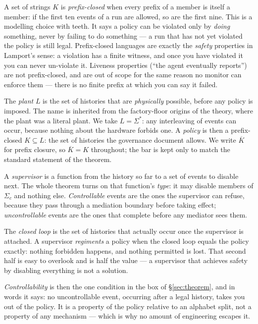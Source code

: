 \documentclass[11pt,a4paper]{article}  \usepackage{mdframed} \usepackage{graphicx}
\begin{document}
A set of strings $K$ is \emph{prefix-closed} when every prefix of a member is itself a member: if the first ten events of a
run are allowed, so are the first nine. This is a modelling choice with teeth. It says a policy can be violated only by
\emph{doing} something, never by failing to do something --- a run that has not yet violated the policy is still legal.
Prefix-closed languages are exactly the \emph{safety} properties in Lamport's sense: a violation has a finite witness, and
once you have violated it you can never un-violate it. Liveness properties (``the agent eventually reports'') are not
prefix-closed, and are out of scope for the same reason no monitor can enforce them --- there is no finite prefix at which
you can say it failed.

The \emph{plant} $L$ is the set of histories that are \emph{physically} possible, before any policy is imposed. The name is
inherited from the factory-floor origins of the theory, where the plant was a literal plant. We take $L=\Sigma^*$: any
interleaving of events can occur, because nothing about the hardware forbids one. A \emph{policy} is then a prefix-closed
$K\subseteq L$: the set of histories the governance document allows. We write $\overline{K}$ for prefix closure, so
$\overline{K}=K$ throughout; the bar is kept only to match the standard statement of the theorem.

A \emph{supervisor} is a function from the history so far to a set of events to disable next. The whole theorem turns on
that function's \emph{type}: it may disable members of $\Sigma_c$ and nothing else. \emph{Controllable} events are the ones
the supervisor can refuse, because they pass through a mediation boundary before taking effect; \emph{uncontrollable} events
are the ones that complete before any mediator sees them.

The \emph{closed loop} is the set of histories that actually occur once the supervisor is attached. A supervisor
\emph{regiments} a policy when the closed loop equals the policy exactly: nothing forbidden happens, and nothing permitted
is lost. That second half is easy to overlook and is half the value --- a supervisor that achieves safety by disabling
everything is not a solution.

\emph{Controllability} is then the one condition in the box of \S\ref{sec:theorem}, and in words it says: no uncontrollable
event, occurring after a legal history, takes you out of the policy. It is a property of the policy relative to an alphabet
split, not a property of any mechanism --- which is why no amount of engineering escapes it.
\end{document}
